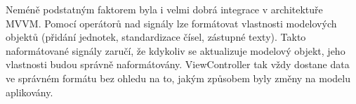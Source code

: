 Neméně podstatným faktorem byla i velmi dobrá integrace v architektuře MVVM.
Pomocí operátorů nad signály lze formátovat vlastnosti modelových objektů (přidání jednotek, standardizace čísel, zástupné texty).
Takto naformátované signály zaručí, že kdykoliv se aktualizuje modelový objekt, jeho vlastnosti budou správně naformátovány.
ViewController tak vždy dostane data ve správném formátu bez ohledu na to, jakým způsobem byly změny na modelu aplikovány.
